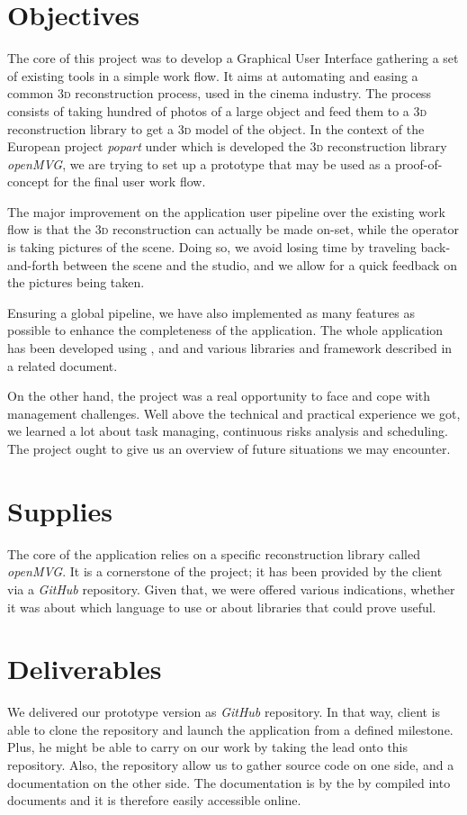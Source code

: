 \section{Objectives}
The core of this project was to develop a Graphical User Interface
gathering a set of existing tools in a simple work flow. It aims at
automating and easing a common \textsc{3d} reconstruction process,
used in the cinema industry. The process consists of taking hundred of
photos of a large object and feed them to a \textsc{3d} reconstruction
library to get a \textsc{3d} model of the object. In the context of
the European project \emph{popart} under which is developed the
\textsc{3d} reconstruction library \emph{openMVG}, we are trying to
set up a prototype that may be used as a proof-of-concept for the
final user work flow. 

The major improvement on the application user pipeline over the
existing work flow is that the \textsc{3d} reconstruction can actually
be made on-set, while the operator is taking pictures of the
scene. Doing so, we avoid losing time by traveling back-and-forth
between the scene and the studio, and we allow for a quick feedback on
the pictures being taken.

Ensuring a global pipeline, we have also implemented as many features
as possible to enhance the completeness of the application. The whole
application has been developed using ,  and
 and various libraries and framework described in a related
document.

On the other hand, the project was a real opportunity to face and cope
with management challenges. Well above the technical and practical
experience we got, we learned a lot about task managing, continuous
risks analysis and scheduling. The project ought to give us an
overview of future situations we may encounter.

\section{Supplies}
The core of the application relies on a specific reconstruction
library called \emph{openMVG}. It is a cornerstone of the project; it
has been provided by the client via a \emph{GitHub} repository. Given
that, we were offered various indications, whether it was about which
language to use or about libraries that could prove useful.

\section{Deliverables}
We delivered our prototype version as \emph{GitHub} repository. In
that way, client is able to clone the repository and launch the
application from a defined milestone. Plus, he might be able to carry
on our work by taking the lead onto this repository.  Also, the
repository allow us to gather source code on one side, and a
documentation on the other side. The documentation is by the by
compiled into  documents and it is therefore easily
accessible online.

